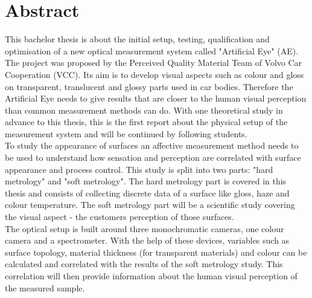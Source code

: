 \chapter*{Abstract}
\label{abstract}
This bachelor thesis is about the initial setup, testing, qualification and optimisation of a new optical measurement system called "Artificial Eye" (AE). The project was proposed by the Perceived Quality Material Team of Volvo Car Cooperation (VCC). Its aim is to develop visual aspects such as colour and gloss on transparent, translucent and glossy parts used in car bodies. Therefore the Artificial Eye needs to give results that are closer to the human visual perception than common measurement methods can do. With one theoretical study in advance to this thesis, this is the first report about the physical setup of the measurement system and will be continued by following students\cite{Chanal2020}.\\

To study the appearance of surfaces an affective measurement method needs to be used to understand how sensation and perception are correlated with surface appearance and process control. This study is split into two parts: "hard metrology" and "soft metrology". The hard metrology part is covered in this thesis and consists of collecting discrete data of a surface like gloss, haze and colour temperature. The soft metrology part will be a scientific study covering the visual aspect - the customers perception of those surfaces.\\

The optical setup is built around three monochromatic cameras, one colour camera and a spectrometer. With the help of these devices, variables such as surface topology, material thickness (for transparent materials) and colour can be calculated and correlated with the results of the soft metrology study. This correlation will then provide information about the human visual perception of the measured sample.